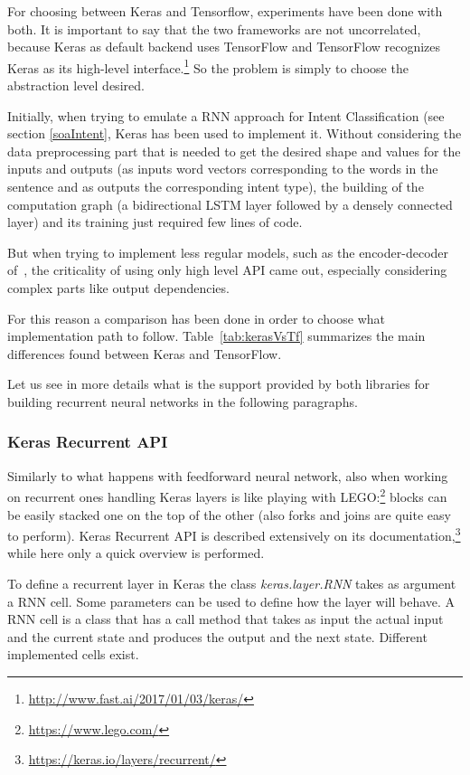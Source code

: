 For choosing between Keras and Tensorflow, experiments have been done with both. It is important to say that the two frameworks are not uncorrelated, because Keras as default backend uses TensorFlow and TensorFlow recognizes Keras as its high-level interface.\footnote{\url{http://www.fast.ai/2017/01/03/keras/}} So the problem is simply to choose the abstraction level desired.

Initially, when trying to emulate a RNN approach for Intent Classification (see section \ref{soaIntent}, Keras has been used to implement it. Without considering the data preprocessing part that is needed to get the desired shape and values for the inputs and outputs (as inputs word vectors corresponding to the words in the sentence and as outputs the corresponding intent type), the building of the computation graph (a bidirectional LSTM layer followed by a densely connected layer) and its training just required few lines of code.

But when trying to implement less regular models, such as the encoder-decoder of~\cite{liu2016attention}, the criticality of using only high level API came out, especially considering complex parts like output dependencies.

For this reason a comparison has been done in order to choose what implementation path to follow. Table~\ref{tab:kerasVsTf} summarizes the main differences found between Keras and TensorFlow.



Let us see in more details what is the support provided by both libraries for building recurrent neural networks in the following paragraphs.

\subsubsection{Keras Recurrent API}
Similarly to what happens with feedforward neural network, also when working on recurrent ones handling Keras layers is like playing with LEGO:\footnote{\url{https://www.lego.com/}} blocks can be easily stacked one on the top of the other (also forks and joins are quite easy to perform). Keras Recurrent API is described extensively on its documentation,\footnote{\url{https://keras.io/layers/recurrent/}} while here only a quick overview is performed.

To define a recurrent layer in Keras the class \textit{keras.layer.RNN} takes as argument a RNN cell. Some parameters can be used to define how the layer will behave. A RNN cell is a class that has a call method that takes as input the actual input and the current state and produces the output and the next state. Different implemented cells exist.

